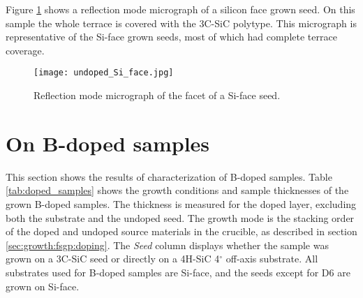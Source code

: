 Figure \ref{fig:silicon_seed} shows a reflection mode micrograph of a silicon face grown seed. On this sample the whole terrace is covered with the 3C-SiC polytype. This micrograph is representative of the Si-face grown seeds, most of which had complete terrace coverage. 

\begin{figure}[H]
\begin{center}
\texttt{[image: undoped\_Si\_face.jpg]}
\caption{Reflection mode micrograph of the facet of a Si-face seed.
\label{fig:silicon_seed}}
\end{center}
\end{figure}




\section{On B-doped samples}
\label{sec:results:doped}
This section shows the results of characterization of B-doped samples. Table \ref{tab:doped_samples} shows the growth conditions and sample thicknesses of the grown B-doped samples. The thickness is measured for the doped layer, excluding both the substrate and the undoped seed. The growth mode is the stacking order of the doped and undoped source materials in the crucible, as described in section \ref{sec:growth:fsgp:doping}. The \emph{Seed} column displays whether the sample was grown on a 3C-SiC seed or directly on a 4H-SiC 4$^\circ$ off-axis substrate. All substrates used for B-doped samples are Si-face, and the seeds except for D6 are grown on Si-face. 

